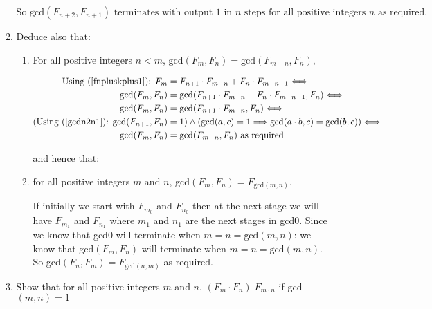 \documentclass[10pt,\jkfside,a4paper]{article}
\begin{document}
\begin{enumerate}
\begin{enumerate}
\begin{equation}\label{gcdn2n1}
\text{So gcd$(F_{n + 2}, F_{n + 1})$ terminates with output 1 in $n$ steps for all positive integers 
$n$ as required.}
\end{equation}

\item Deduce also that:

\begin{enumerate}[label=(\roman*)]

\item For all positive integers $n < m$, gcd$(F_m, F_n) = \text{gcd}(F_{m - n}, F_n)$,

\begin{equation}
\begin{split}
\text{Using (\ref{fnpluskplus1}): } F_m &= F_{n + 1} \cdot F_{m - n} + F_{n} \cdot F_{m - n - 1} \Longleftrightarrow\\
\text{gcd}(F_m, F_n) &= \text{gcd}(F_{n + 1} \cdot F_{m - n} + F_{n} \cdot F_{m - n - 1}, F_n)\Longleftrightarrow\\
\text{gcd}(F_m, F_n) &= \text{gcd}(F_{n + 1} \cdot F_{m - n}, F_n)\Longleftrightarrow\\
(\text{Using (\ref{gcdn2n1}): gcd}(F_{n + 1}, F_n) &= 1) \wedge (\text{gcd}(a, c) = 1 \Longrightarrow \text{gcd}(a\cdot b, c) = \text{gcd}(b, c))\Longleftrightarrow\\
\text{gcd}(F_m, F_n) &= \text{gcd}(F_{m - n}, F_n) \text{ as required}\\
\end{split}
\end{equation}

and hence that:

\item for all positive integers $m$ and $n$, gcd$(F_m, F_n) = F_{\text{gcd}(m, n)}$.

If initially we start with $F_{m_0}$ and $F_{n_0}$ then at the next stage we will have $F_{m_1}$ and 
$F_{n_1}$ where $m_1$ and $n_1$ are the next stages in gcd0. Since we know that gcd0 will terminate when 
$m = n = \text{gcd}(m, n)$: we know that gcd$(F_m, F_n)$ will terminate when $m = n = \text{gcd}(m, n)$. 
So gcd$(F_n, F_m) = F_{\text{gcd}(n, m)}$ as required.

\end{enumerate}

\item Show that for all positive integers $m$ and $n$, $(F_m \cdot F_n) | F_{m \cdot n}$ if gcd$(m, n) = 1$


\end{enumerate}
\end{enumerate}
\end{document}
